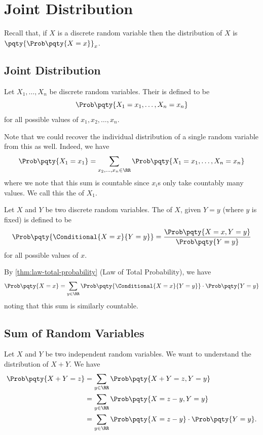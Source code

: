 \section{Joint Distribution}

Recall that, if \(X\) is a discrete random variable then the distribution of \(X\) is \(\pqty{\Prob\pqty{X = x}}_x\).

\subsection{Joint Distribution}

\begin{definition}
    \label{def:joint-distribution-discrete}%
    Let \(X_1, \ldots, X_n\) be discrete random variables. Their  is defined to be
    \[
        \Prob\pqty{X_1 = x_1, \ldots, X_n = x_n}
    \]
    for all possible values of \(x_1, x_2, \ldots, x_n\).
\end{definition}

Note that we could recover the individual distribution of a single random variable from this as well. Indeed, we have
\[
    \Prob\pqty{X_1 = x_1} = \sum_{x_2, \ldots, x_n \in \RR} \Prob\pqty{X_1 = x_1, \ldots, X_n = x_n}
\]
where we note that this sum is countable since \(x_i\)s only take countably many values. We call this the  of \(X_1\).

\begin{definition}
    \label{def:conditional-distribution-discrete}%
    Let \(X\) and \(Y\) be two discrete random variables. The  of \(X\), given \(Y = y\) (where \(y\) is fixed) is defined to be
    \[
        \Prob\pqty{\Conditional{X = x}{Y = y}} = \frac{\Prob\pqty{X = x, Y = y}}{\Prob\pqty{Y = y}}
    \]
    for all possible values of \(x\).
\end{definition}

By \autoref{thm:law-total-probability} (Law of Total Probability), we have
\[
    \Prob\pqty{X = x} = \sum_{y \in \RR} \Prob\pqty{\Conditional{X = x}{Y = y}} \cdot \Prob\pqty{Y = y}
\]
noting that this sum is similarly countable.

\subsection{Sum of Random Variables}

\begin{example}
    \label{ex:distribution-sum-discrete}%
    Let \(X\) and \(Y\) be two independent random variables. We want to understand the distribution of \(X + Y\). We have
    \begin{align*}
        \Prob\pqty{X + Y = z} &= \sum_{y \in \RR} \Prob\pqty{X + Y = z, Y = y} \\
        &= \sum_{y \in \RR} \Prob\pqty{X = z - y, Y = y} \\
        &= \sum_{y \in \RR} \Prob\pqty{X = z - y} \cdot \Prob\pqty{Y = y}.
    \end{align*}
\end{example}

